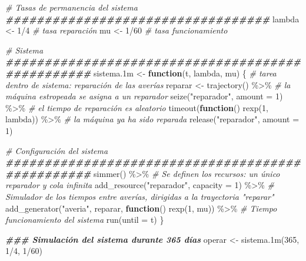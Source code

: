 \documentclass[
]{book}
\newenvironment{Shaded}{\begin{snugshade}}{\end{snugshade}}
\newcommand{\AttributeTok}[1]{\textcolor[rgb]{0.77,0.63,0.00}{#1}}
\newcommand{\CommentTok}[1]{\textcolor[rgb]{0.56,0.35,0.01}{\textit{#1}}}
\newcommand{\ControlFlowTok}[1]{\textcolor[rgb]{0.13,0.29,0.53}{\textbf{#1}}}
\newcommand{\DecValTok}[1]{\textcolor[rgb]{0.00,0.00,0.81}{#1}}
\newcommand{\DocumentationTok}[1]{\textcolor[rgb]{0.56,0.35,0.01}{\textbf{\textit{#1}}}}
\newcommand{\FloatTok}[1]{\textcolor[rgb]{0.00,0.00,0.81}{#1}}
\newcommand{\FunctionTok}[1]{\textcolor[rgb]{0.00,0.00,0.00}{#1}}
\newcommand{\NormalTok}[1]{#1}
\newcommand{\OtherTok}[1]{\textcolor[rgb]{0.56,0.35,0.01}{#1}}
\newcommand{\SpecialCharTok}[1]{\textcolor[rgb]{0.00,0.00,0.00}{#1}}
\newcommand{\StringTok}[1]{\textcolor[rgb]{0.31,0.60,0.02}{#1}}
\theoremstyle{definition}
\theoremstyle{definition}
\theoremstyle{definition}
\theoremstyle{definition}
\theoremstyle{remark}
\begin{document}
\begin{Shaded}
\begin{Highlighting}[]
\CommentTok{\# Tasas de permanencia del sistema}
\DocumentationTok{\#\#\#\#\#\#\#\#\#\#\#\#\#\#\#\#\#\#\#\#\#\#\#\#\#\#\#\#\#\#\#\#\#\#}
\NormalTok{lambda }\OtherTok{\textless{}{-}} \DecValTok{1}\SpecialCharTok{/}\DecValTok{4}  \CommentTok{\# tasa reparación}
\NormalTok{mu }\OtherTok{\textless{}{-}} \DecValTok{1}\SpecialCharTok{/}\DecValTok{60}     \CommentTok{\# tasa funcionamiento}

\CommentTok{\# Sistema}
\DocumentationTok{\#\#\#\#\#\#\#\#\#\#\#\#\#\#\#\#\#\#\#\#\#\#\#\#\#\#\#\#\#\#\#\#\#\#\#\#\#\#\#\#\#\#\#\#\#\#\#\#\#}
\NormalTok{sistema}\FloatTok{.1}\NormalTok{m }\OtherTok{\textless{}{-}} \ControlFlowTok{function}\NormalTok{(t, lambda, mu)}
\NormalTok{\{}
  \CommentTok{\# tarea dentro de sistema: reparación de las averías}
\NormalTok{  reparar }\OtherTok{\textless{}{-}} \FunctionTok{trajectory}\NormalTok{() }\SpecialCharTok{\%\textgreater{}\%}
    \CommentTok{\# la máquina estropeada se asigna a un reparador}
    \FunctionTok{seize}\NormalTok{(}\StringTok{"reparador"}\NormalTok{, }\AttributeTok{amount =} \DecValTok{1}\NormalTok{) }\SpecialCharTok{\%\textgreater{}\%}              
    \CommentTok{\# el tiempo de reparación es aleatorio}
    \FunctionTok{timeout}\NormalTok{(}\ControlFlowTok{function}\NormalTok{() }\FunctionTok{rexp}\NormalTok{(}\DecValTok{1}\NormalTok{, lambda)) }\SpecialCharTok{\%\textgreater{}\%}   
    \CommentTok{\# la máquina ya ha sido reparada}
    \FunctionTok{release}\NormalTok{(}\StringTok{"reparador"}\NormalTok{, }\AttributeTok{amount =} \DecValTok{1}\NormalTok{)               }

  \CommentTok{\# Configuración del sistema }
  \DocumentationTok{\#\#\#\#\#\#\#\#\#\#\#\#\#\#\#\#\#\#\#\#\#\#\#\#\#\#\#\#\#\#\#\#\#\#\#\#\#\#\#\#\#\#\#\#\#\#\#\#\#}
  \FunctionTok{simmer}\NormalTok{() }\SpecialCharTok{\%\textgreater{}\%}
    \CommentTok{\# Se definen los recursos: un único reparador y cola infinita}
    \FunctionTok{add\_resource}\NormalTok{(}\StringTok{"reparador"}\NormalTok{, }\AttributeTok{capacity =} \DecValTok{1}\NormalTok{) }\SpecialCharTok{\%\textgreater{}\%}           
    \CommentTok{\# Simulador de los tiempos entre averías, dirigidas a la trayectoria "reparar"}
    \FunctionTok{add\_generator}\NormalTok{(}\StringTok{"averia"}\NormalTok{, reparar, }\ControlFlowTok{function}\NormalTok{() }\FunctionTok{rexp}\NormalTok{(}\DecValTok{1}\NormalTok{, mu)) }\SpecialCharTok{\%\textgreater{}\%} 
    \CommentTok{\# Tiempo funcionamiento del sistema}
    \FunctionTok{run}\NormalTok{(}\AttributeTok{until =}\NormalTok{ t)     }
\NormalTok{\}}

\DocumentationTok{\#\#\# Simulación del sistema durante 365 días}
\NormalTok{operar }\OtherTok{\textless{}{-}} \FunctionTok{sistema.1m}\NormalTok{(}\DecValTok{365}\NormalTok{, }\DecValTok{1}\SpecialCharTok{/}\DecValTok{4}\NormalTok{, }\DecValTok{1}\SpecialCharTok{/}\DecValTok{60}\NormalTok{)}
\end{Highlighting}
\end{Shaded}
\end{document}
